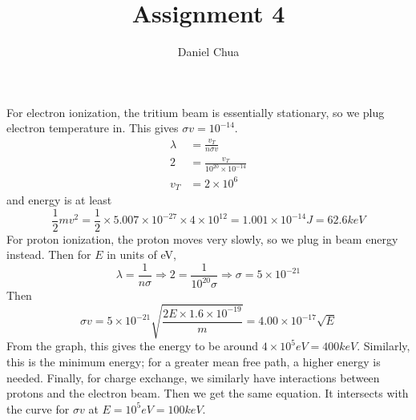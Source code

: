\documentclass[answers]{exam}
\title{Assignment 4}
\author{Daniel Chua}
\begin{document}
\maketitle


\begin{questions}


\begin{solution}
    For electron ionization, the tritium beam is essentially stationary, so we plug electron temperature in. This gives $\sigma v = 10^{-14}$.
    \begin{align*}
        \lambda &= \frac{v_T}{n\sigma v} \\
        2 &= \frac{v_T}{10^{20} \times 10^{-14}} \\
        v_T &= 2 \times 10^6
    \end{align*}
    and energy is at least
    $$\frac{1}{2}mv^2 = \frac{1}{2} \times 5.007 \times 10^{-27} \times 4 \times 10^{12} = 1.001 \times 10^{-14}\unit{J} = 62.6\unit{keV}$$
    For proton ionization, the proton moves very slowly, so we plug in beam energy instead. Then for $E$ in units of eV,
    $$\lambda = \frac{1}{n\sigma} \Rightarrow 2 = \frac{1}{10^{20}\sigma} \Rightarrow \sigma = 5 \times 10^{-21}$$
    Then
    $$\sigma v = 5 \times 10^{-21} \sqrt{\frac{2E \times 1.6 \times 10^{-19}}{m}} = 4.00 \times 10^{-17} \sqrt{E}$$
    From the graph, this gives the energy to be around $4 \times 10^5\unit{eV} = 400\unit{keV}$. Similarly, this is the minimum energy; for a greater mean free path, a higher energy is needed. Finally, for charge exchange, we similarly have interactions between protons and the electron beam. Then we get the same equation. It intersects with the curve for $\sigma v$ at $E = 10^5\unit{eV} = 100\unit{keV}$.

\end{solution}




\end{questions}
\end{document}
